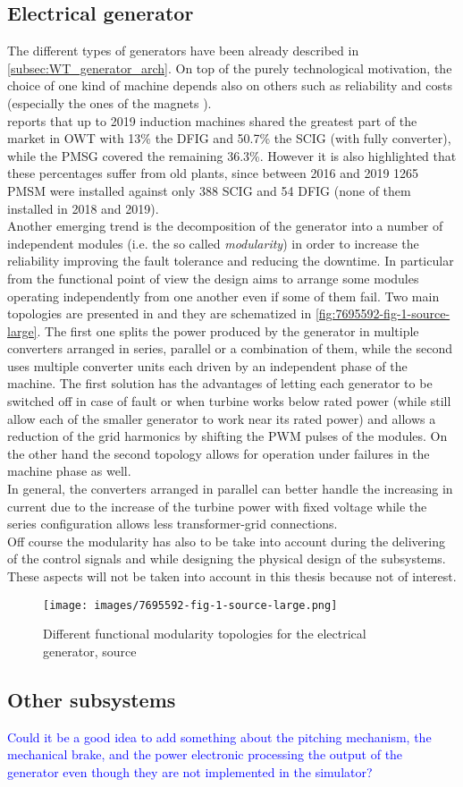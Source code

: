 \subsection{Electrical generator}
The different types of generators have been already described in \autoref{subsec:WT_generator_arch}. On top of the purely technological motivation, the choice of one kind of machine depends also on others such as reliability and costs (especially the ones of the magnets \cite{1-s2.0-S0040162519313691-main}). \\
\cite{current_staus_and_future_trends_of_offshore_wind_power_in_europe} reports that up to 2019 induction machines shared the greatest part of the market in OWT with 13\% the DFIG and 50.7\% the SCIG (with fully converter), while the PMSG covered the remaining 36.3\%. However it is also highlighted that these percentages suffer from old plants, since between 2016 and 2019 1265 PMSM were installed against only 388 SCIG and 54 DFIG (none of them installed in 2018 and 2019).  \\
Another emerging trend is the decomposition of the generator into a number of  independent modules (i.e. the so called \textit{modularity}) in order to increase the reliability improving the fault tolerance and reducing the downtime. In particular from the functional point of view the design aims to arrange some modules operating independently from one another even if some of them fail. Two main topologies are presented in \cite{7695592} and they are schematized in \autoref{fig:7695592-fig-1-source-large}. The first one splits the power produced by the generator in multiple converters arranged in series, parallel or a combination of them, while the second uses multiple converter units each driven by an independent phase of the machine. The first solution has the advantages of letting each generator to be switched off in case of fault or when turbine works below rated power (while still allow each of the smaller generator to work near its rated power) and allows a reduction of the grid harmonics by shifting the PWM pulses of the modules. On the other hand the second topology allows for operation under failures in the machine phase as well. \\
In general, the converters arranged in parallel can better handle the increasing in current due to the increase of the turbine power with fixed voltage while the series configuration allows less transformer-grid connections.\\
Off course the modularity has also to be take into account during the delivering of the control signals and while designing the physical design of the subsystems. These aspects will not be taken into account in this thesis because not of interest.  
\begin{figure}[htb]
  \centering
  \texttt{[image: images/7695592-fig-1-source-large.png]}
  \caption{Different functional modularity topologies for the electrical generator, source \cite{7695592} }
  \label{fig:7695592-fig-1-source-large}
\end{figure}

\subsection{Other subsystems}
\textcolor{blue}{Could it be a good idea to add something about the pitching mechanism, the mechanical brake, and the power electronic processing the output of the generator even though they are not implemented in the simulator?}




